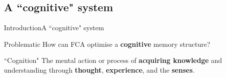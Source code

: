 \subsection{A ``cognitive" system}
\begin{frame}{Introduction}{A ``cognitive" system}


\begin{block}{Problematic}
{
How can FCA  optimise a \textbf{cognitive} memory structure?
}
\end{block}

\vskip7mm

\begin{block}{``Cognition"}
{
  The mental action or process of \textbf{acquiring knowledge} and 
  understanding through \textbf{thought}, \textbf{experience}, and the 
  \textbf{senses}.
}
\vskip2mm
\hspace*{}
\end{block}

\end{frame}


